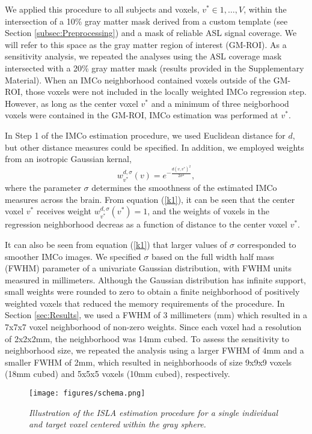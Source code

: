 \documentclass[review]{elsarticle}
\begin{document}
\noindent We applied this procedure to all subjects and voxels, $v^{*} \in {1, \dots, V}$, within the intersection of a 10\% gray matter mask derived from a custom template (see Section \ref{subsec:Preprocessing}) and a mask of reliable ASL signal coverage. We will refer to this space as the gray matter region of interest (GM-ROI). As a sensitivity analysis, we repeated the analyses using the ASL coverage mask intersected with a 20\% gray matter mask (results provided in the Supplementary Material). When an IMCo neighborhood contained voxels outside of the GM-ROI, those voxels were not included in the locally weighted IMCo regression step. However, as long as the center voxel $v^{*}$ and a minimum of three neigborhood voxels were contained in the GM-ROI, IMCo estimation was performed at $v^{*}$. 

In Step 1 of the IMCo estimation procedure, we used Euclidean distance for $d$, but other distance measures could be specified. In addition, we employed weights from an isotropic Gaussian kernal, 
\begin{equation}
\label{k1}
w_{v^{*}}^{d, \sigma}(v) = e^{-\frac{d(v, v^{*})^2}{2\sigma^2}},
\end{equation}
where the parameter $\sigma$ determines the smoothness of the estimated IMCo measures across the brain. From equation (\ref{k1}), it can be seen that the center voxel $v^{*}$ receives weight $w_{v^{*}}^{d, \sigma}(v^{*})=1$, and the weights of voxels in the regression neighborhood decreas as a function of distance to the center voxel $v^{*}$. 

It can also be seen from equation (\ref{k1}) that larger values of $\sigma$ corresponded to smoother IMCo images. We specified $\sigma$ based on the full width half mass (FWHM) parameter of a univariate Gaussian distribution, with FWHM units measured in millimeters. Although the Gaussian distribution has infinite support, small weights were rounded to zero to obtain a finite neighborhood of positively weighted voxels that reduced the memory requirements of the procedure. In Section \ref{sec:Results}, we used a FWHM of 3 millimeters (mm) which resulted in a 7x7x7 voxel neighborhood of non-zero weights. Since each voxel had a resolution of 2x2x2mm, the neighborhood was 14mm cubed. To assess the sensitivity to neighborhood  size, we repeated the analysis using a larger FWHM of 4mm and a smaller FWHM of 2mm, which resulted in neighborhoods of size 9x9x9 voxels (18mm cubed) and 5x5x5 voxels (10mm cubed), respectively. 

\begin{figure}
\begin{center}
\texttt{[image: figures/schema.png]}
\end{center}
\caption{\emph{Illustration of the ISLA estimation procedure for a single individual and target voxel centered within the gray sphere.}}\label{schema} 
\end{figure}
\end{document}
